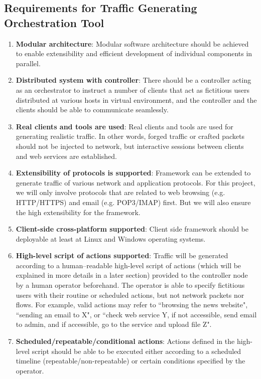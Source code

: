 \documentclass[12pt]{report}
\begin{document}
\subsection{Requirements for Traffic Generating Orchestration Tool}
\label{framework-requirements}
\begin{enumerate}
\item \textbf{Modular architecture}: Modular software architecture should be achieved to enable extensibility and efficient development of individual components in parallel.\item \textbf{Distributed system with controller}: There should be a controller acting as an orchestrator to instruct a number of clients that act as fictitious users distributed at various hosts in virtual environment, and the controller and the clients should be able to communicate seamlessly.
\item \textbf{Real clients and tools are used}: Real clients and tools are used for generating realistic traffic. In other words, forged traffic or crafted packets should not be injected to network, but interactive sessions between clients and web services are established.
\item \textbf{Extensibility of protocols is supported}: Framework can be extended to generate traffic of various network and application protocols. For this project, we will only involve protocols that are related to web browsing (e.g. HTTP/HTTPS) and email (e.g. POP3/IMAP) first. But we will also ensure the high extensibility for the framework.
\item \textbf{Client-side cross-platform supported}: Client side framework should be deployable at least at Linux and Windows operating systems.
\item \textbf{High-level script of actions supported}: Traffic will be generated according to a human--readable high-level script of actions (which will be explained in more details in a later section) provided to the controller node by a human operator beforehand. The operator is able to specify fictitious users with their routine or scheduled actions, but not network packets nor flows. For example, valid actions may refer to ``browsing the news website", ``sending an email to X", or ``check web service Y, if not accessible, send email to admin, and if accessible, go to the service and upload file Z".
\item \textbf{Scheduled/repeatable/conditional actions}: Actions defined in the high-level script should be able to be executed either according to a scheduled timeline (repeatable/non-repeatable) or certain conditions specified by the operator.

\end{enumerate}
\end{document}
